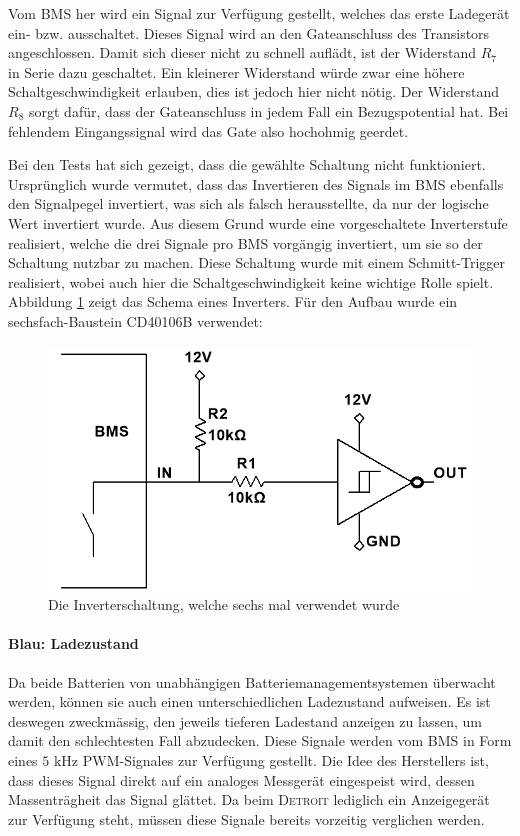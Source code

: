Vom BMS her wird ein Signal zur Verfügung gestellt, welches das erste Ladegerät ein- bzw. ausschaltet. Dieses Signal wird an den Gateanschluss des Transistors angeschlossen. Damit sich dieser nicht zu schnell auflädt, ist der Widerstand $R_7$ in Serie dazu geschaltet. Ein kleinerer Widerstand würde zwar eine höhere Schaltgeschwindigkeit erlauben, dies ist jedoch hier nicht nötig. Der Widerstand $R_8$ sorgt dafür, dass der Gateanschluss in jedem Fall ein Bezugspotential hat. Bei fehlendem Eingangssignal wird das Gate also hochohmig geerdet.

Bei den Tests hat sich gezeigt, dass die gewählte Schaltung nicht funktioniert. Ursprünglich wurde vermutet, dass das Invertieren des Signals im BMS ebenfalls den Signalpegel invertiert, was sich als falsch herausstellte, da nur der logische Wert invertiert wurde. Aus diesem Grund wurde eine vorgeschaltete Inverterstufe realisiert, welche die drei Signale pro BMS vorgängig invertiert, um sie so der Schaltung nutzbar zu machen. Diese Schaltung wurde mit einem Schmitt-Trigger realisiert, wobei auch hier die Schaltgeschwindigkeit keine wichtige Rolle spielt. Abbildung \ref{fig:Inverter} zeigt das Schema eines Inverters. Für den Aufbau wurde ein sechsfach-Baustein CD40106B \cite{schmitt} verwendet:

\begin{figure}[h]
	\centering
		\includegraphics[width=.60\textwidth]{images/Inverter.png}
	\caption{Die Inverterschaltung, welche sechs mal verwendet wurde}
	\label{fig:Inverter}
\end{figure}

\newpage

\paragraph{Blau: Ladezustand}
Da beide Batterien von unabhängigen Batteriemanagementsystemen überwacht werden, können sie auch einen unterschiedlichen Ladezustand aufweisen. Es ist deswegen zweckmässig, den jeweils tieferen Ladestand anzeigen zu lassen, um damit den schlechtesten Fall abzudecken. Diese Signale werden vom BMS in Form eines $5$ kHz PWM-Signales zur Verfügung gestellt. Die Idee des Herstellers ist, dass dieses Signal direkt auf ein analoges Messgerät eingespeist wird, dessen Massenträgheit das Signal glättet. Da beim \textsc{Detroit} lediglich ein Anzeigegerät zur Verfügung steht, müssen diese Signale bereits vorzeitig verglichen werden.

